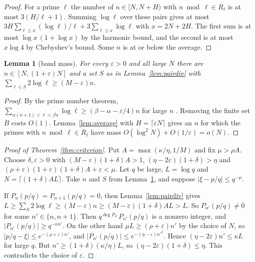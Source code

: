 \documentclass[11pt]{amsart}
\newtheorem{lemma}[theorem]{Lemma}
\theoremstyle{definition}
\theoremstyle{remark}
\numberwithin{equation}{section}
\begin{document}
\begin{proof}
For a prime $\ell$ the number of $n\in[N,N+H)$ with $n\bmod\ell\in R_\ell$ is at most $3(H/\ell+1)$. Summing
$\log\ell$ over these pairs gives at most $3H\sum_{\ell\le x}(\log\ell)/\ell+3\sum_{\ell\le x}\log\ell$ with
$x=2N+2H$. The first sum is at most $\log x\,(1+\log x)$ by the harmonic bound, and the second is at most $x\log4$ by
Chebyshev's bound. Some $n$ is at or below the average.
\end{proof}

\begin{lemma}[band mass]\label{lem:mass}
For every $\varepsilon>0$ and all large $N$ there are $n\in[N,(1+\varepsilon)N]$ and a set $S$ as in
Lemma~\ref{lem:pairdiv} with $\sum_{\ell\in S}2\log\ell\ge(M-\varepsilon)n$.
\end{lemma}

\begin{proof}
By the prime number theorem, $\sum_{\alpha(n+1)<\ell<\beta n}\log\ell\ge(\beta-\alpha-\varepsilon/4)n$ for large $n$
\cite{Davenport}. Removing the finite set $B$ costs $O(1)$. Lemma~\ref{lem:average} with $H=\lceil\varepsilon N\rceil$
gives an $n$ for which the primes with $n\bmod\ell\in R_\ell$ have mass $O(\log^2N)+O(1/\varepsilon)=o(N)$.
\end{proof}

\begin{proof}[Proof of Theorem~\ref{thm:criterion}]
Put $A=\max(\kappa/\eta,1/M)$ and fix $\mu>\rho A$. Choose $\delta,\varepsilon>0$ with $(M-\varepsilon)(1+\delta)A>1$,
$(\eta-2\varepsilon)(1+\delta)>\eta$ and $(\rho+\varepsilon)(1+\varepsilon)(1+\delta)A+\varepsilon<\mu$. Let $q$ be large,
$L=\log q$ and $N=\lceil(1+\delta)AL\rceil$. Take $n$ and $S$ from Lemma~\ref{lem:mass}, and suppose
$|\xi-p/q|\le q^{-\mu}$.

If $P_n(p/q)=P_{n+1}(p/q)=0$, then Lemma~\ref{lem:pairdiv} gives $L\ge\sum_S2\log\ell\ge(M-\varepsilon)n\ge
(M-\varepsilon)(1+\delta)AL>L$. So $P_{n'}(p/q)\ne0$ for some $n'\in\{n,n+1\}$. Then $q^{\deg P_{n'}}P_{n'}(p/q)$ is a
nonzero integer, and $|P_{n'}(p/q)|\ge q^{-\kappa n'}$. On the other hand $\mu L\ge(\rho+\varepsilon)n'$ by the choice
of $N$, so $|p/q-\xi|\le e^{-(\rho+\varepsilon)n'}$, and $|P_{n'}(p/q)|\le e^{-(\eta-\varepsilon)n'^2}$. Hence
$(\eta-2\varepsilon)n'\le\kappa L$ for large $q$. But $n'\ge(1+\delta)(\kappa/\eta)L$, so
$(\eta-2\varepsilon)(1+\delta)\le\eta$. This contradicts the choice of $\varepsilon$.
\end{proof}
\end{document}
